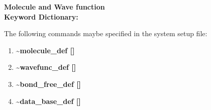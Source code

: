 \clearpage
\begin{center}
\huge
{\bf Molecule and Wave function \\
Keyword Dictionary: } 
\end{center}

The following commands maybe specified in the system setup file:
\begin{enumerate}
\LARGE
\item {\bf \~{}molecule\_def []}
\item {\bf \~{}wavefunc\_def []}
\item {\bf \~{}bond\_free\_def []}
\item {\bf \~{}data\_base\_def []}
\end{enumerate}

